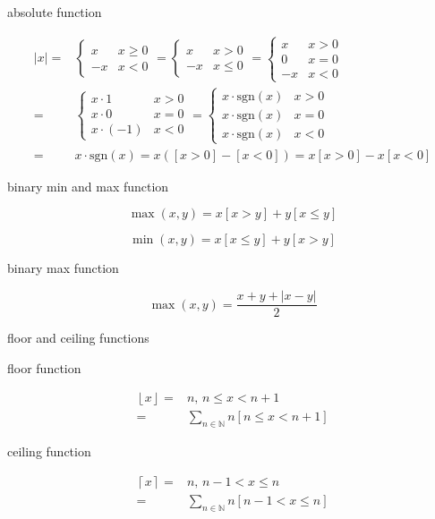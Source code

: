 \documentclass[
]{book}
\theoremstyle{definition}
\theoremstyle{definition}
\theoremstyle{definition}
\theoremstyle{definition}
\theoremstyle{remark}
\begin{document}
absolute function

\[
\begin{aligned}
\left|x\right|= & \begin{cases}
x & x\ge0\\
-x & x<0
\end{cases}=\begin{cases}
x & x>0\\
-x & x\le0
\end{cases}=\begin{cases}
x & x>0\\
0 & x=0\\
-x & x<0
\end{cases}\\
= & \begin{cases}
x\cdot1 & x>0\\
x\cdot0 & x=0\\
x\cdot\left(-1\right) & x<0
\end{cases}=\begin{cases}
x\cdot\mathrm{sgn}\left(x\right) & x>0\\
x\cdot\mathrm{sgn}\left(x\right) & x=0\\
x\cdot\mathrm{sgn}\left(x\right) & x<0
\end{cases}\\
= & x\cdot\mathrm{sgn}\left(x\right)=x\left(\left[x>0\right]-\left[x<0\right]\right)=x\left[x>0\right]-x\left[x<0\right]
\end{aligned}
\]

binary min and max function

\[
\max\left(x,y\right)=x\left[x>y\right]+y\left[x\le y\right]
\]

\[
\min\left(x,y\right)=x\left[x\le y\right]+y\left[x>y\right]
\]

binary max function

\[
\max\left(x,y\right)=\dfrac{x+y+\left|x-y\right|}{2}
\]

floor and ceiling functions

floor function

\[
\begin{aligned}
\left\lfloor x\right\rfloor = & n,\,n\le x<n+1\\
= & \sum_{n\in\mathbb{N}}n\left[n\le x<n+1\right]
\end{aligned}
\]

ceiling function

\[
\begin{aligned}
\left\lceil x\right\rceil = & n,\,n-1<x\le n\\
= & \sum_{n\in\mathbb{N}}n\left[n-1<x\le n\right]
\end{aligned}
\]
\end{document}
